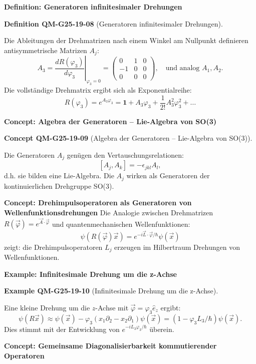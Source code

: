 \documentclass[10pt, letterpaper]{article}
\newcommand{\CustomHeading}[3]{%
  \par\medskip\noindent%
  \textbf{#1 #2} \textnormal{(#3)}.\enskip%
}
\newenvironment{DEF}[2]{\begin{unitbox}\CustomHeading{Definition}{#1}{#2}}{\end{unitbox}}
\newenvironment{EXA}[2]{\begin{unitbox}\CustomHeading{Example}{#1}{#2}}{\end{unitbox}}
\newenvironment{CONC}[2]{\begin{unitbox}\CustomHeading{Concept}{#1}{#2}}{\end{unitbox}}
\begin{document}
\textbf{Definition: Generatoren infinitesimaler Drehungen} 


\begin{DEF}{QM-G25-19-08}{Generatoren infinitesimaler Drehungen}
Die Ableitungen der Drehmatrizen nach einem Winkel am Nullpunkt definieren antisymmetrische Matrizen $A_j$:
$$
A_3 = \left.\frac{dR(\varphi_3)}{d\varphi_3}\right|_{\varphi_3=0} =
\begin{pmatrix}
0 & 1 & 0 \\
-1 & 0 & 0 \\
0 & 0 & 0
\end{pmatrix}, \quad \text{und analog } A_1, A_2.
$$
Die vollständige Drehmatrix ergibt sich als Exponentialreihe:
$$
R(\varphi_3) = e^{A_3 \varphi_3} = \mathbf{1} + A_3 \varphi_3 + \frac{1}{2!} A_3^2 \varphi_3^2 + \dots
$$
\end{DEF}



\textbf{Concept: Algebra der Generatoren – Lie-Algebra von SO(3)}  
\begin{CONC}{QM-G25-19-09}{Algebra der Generatoren – Lie-Algebra von SO(3)}
Die Generatoren $A_j$ genügen den Vertauschungsrelationen:
$$
[A_j, A_k] = -\epsilon_{jkl} A_l,
$$
d.h. sie bilden eine Lie-Algebra. Die $A_j$ wirken als Generatoren der kontinuierlichen Drehgruppe SO(3).


\textbf{Concept: Drehimpulsoperatoren als Generatoren von Wellenfunktionsdrehungen}  
Die Analogie zwischen Drehmatrizen $R(\vec{\varphi}) = e^{\vec{A} \cdot \vec{\varphi}}$ und quantenmechanischen Wellenfunktionen:
$$
\psi(R(\vec{\varphi}) \vec{x}) = e^{-i \vec{L} \cdot \vec{\varphi} / \hbar} \psi(\vec{x})
$$
zeigt: die Drehimpulsoperatoren $L_j$ erzeugen im Hilbertraum Drehungen von Wellenfunktionen.
\end{CONC}



\textbf{Example: Infinitesimale Drehung um die z-Achse}  

\begin{EXA}{QM-G25-19-10}{Infinitesimale Drehung um die z-Achse}
Eine kleine Drehung um die $z$-Achse mit $\vec{\varphi} = \varphi_3 \hat{e}_z$ ergibt:
$$
\psi(R \vec{x}) \approx \psi(\vec{x}) - \varphi_3 (x_1 \partial_2 - x_2 \partial_1) \psi(\vec{x}) = (1 - \varphi_3 L_3/\hbar) \psi(\vec{x}).
$$
Dies stimmt mit der Entwicklung von $e^{-i L_3 \varphi_3 / \hbar}$ überein.
\end{EXA}



\textbf{Concept: Gemeinsame Diagonalisierbarkeit kommutierender Operatoren}
\end{document}
